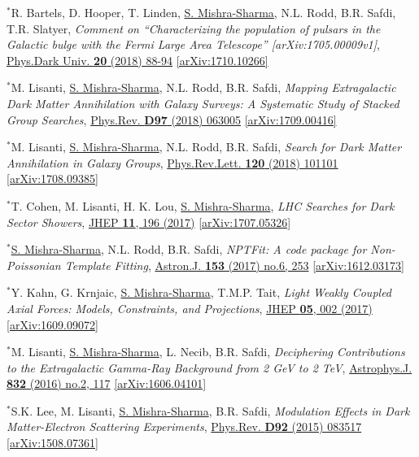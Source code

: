 \documentclass[letterpaper,11pt]{article}
\newenvironment{packed_enumerate}[1][]{
\begin{etaremune}[#1]
  \setlength{\itemsep}{4.0pt}
  \setlength{\parskip}{0pt}
  \setlength{\parsep}{0pt}}{\end{etaremune}
}
\begin{document}
\begin{packed_enumerate}[start=56]
  \item $^*$R. Bartels, D. Hooper, T. Linden, \underline{S. Mishra-Sharma}, N.L. Rodd, B.R. Safdi, T.R. Slatyer, \emph{Comment on ``Characterizing the population of pulsars in the Galactic bulge with the
  {\it Fermi} Large Area Telescope'' [arXiv:1705.00009\MakeLowercase{v}1]}, \href{https://www.sciencedirect.com/science/article/pii/S2212686418300268}{Phys.Dark Univ. \textbf{20} (2018) 88-94} \href{https://arxiv.org/abs/1710.10266}{[arXiv:1710.10266]}
  \item $^*$M. Lisanti, \underline{S. Mishra-Sharma}, N.L. Rodd, B.R. Safdi, \emph{Mapping Extragalactic Dark Matter Annihilation with Galaxy Surveys: A Systematic Study of Stacked Group Searches},  \href{https://journals.aps.org/prd/abstract/10.1103/PhysRevD.97.063005}{Phys.Rev. \textbf{D97} (2018) 063005} \href{https://arxiv.org/abs/1709.00416}{[arXiv:1709.00416]}
  \item $^*$M. Lisanti, \underline{S. Mishra-Sharma}, N.L. Rodd, B.R. Safdi, \emph{Search for Dark Matter Annihilation in Galaxy Groups},  \href{https://journals.aps.org/prl/abstract/10.1103/PhysRevLett.120.101101}{Phys.Rev.Lett. \textbf{120} (2018) 101101} \href{https://arxiv.org/abs/1708.09385}{[arXiv:1708.09385]}
  \item $^*$T. Cohen, M. Lisanti, H. K. Lou, \underline{S. Mishra-Sharma}, \emph{LHC Searches for Dark Sector Showers},  \href{https://link.springer.com/article/10.1007/JHEP11(2017)196}{JHEP \textbf{11}, 196 (2017)}  \href{https://arxiv.org/abs/1707.05326}{ [arXiv:1707.05326]}
  \item $^*$\underline{S. Mishra-Sharma}, N.L. Rodd, B.R. Safdi, \emph{NPTFit: A code package for Non-Poissonian Template Fitting},  \href{http://iopscience.iop.org/article/10.3847/1538-3881/aa6d5f/meta}{Astron.J. \textbf{153} (2017) no.6, 253}  \href{https://arxiv.org/abs/1612.03173}{ [arXiv:1612.03173]}
  \item $^*$Y. Kahn, G. Krnjaic, \underline{S. Mishra-Sharma}, T.M.P. Tait, \emph{Light Weakly Coupled Axial Forces: Models, Constraints, and Projections},  \href{https://link.springer.com/article/10.1007%2FJHEP05%282017%29002}{JHEP \textbf{05}, 002 (2017)}  \href{https://arxiv.org/abs/1609.09072}{[arXiv:1609.09072]}
  \item $^*$M. Lisanti, \underline{S. Mishra-Sharma}, L. Necib, B.R. Safdi, \emph{Deciphering Contributions to the Extragalactic Gamma-Ray Background from 2 GeV to 2 TeV},  \href{http://iopscience.iop.org/article/10.3847/0004-637X/832/2/117/meta}{Astrophys.J. \textbf{832} (2016) no.2, 117} \href{https://arxiv.org/abs/1606.04101}{[arXiv:1606.04101]}
  \item $^*$S.K. Lee, M. Lisanti, \underline{S. Mishra-Sharma}, B.R. Safdi, \emph{Modulation Effects in Dark Matter-Electron Scattering Experiments}, \href{https://journals.aps.org/prd/abstract/10.1103/PhysRevD.92.083517}{Phys.Rev. \textbf{D92} (2015) 083517} \href{https://arxiv.org/abs/1508.07361}{[arXiv:1508.07361]}
\end{packed_enumerate}
\end{document}
